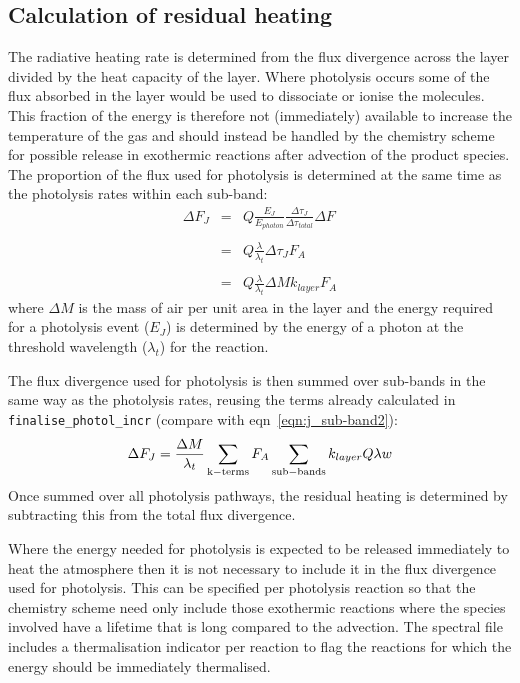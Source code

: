 \subsection{Calculation of residual heating}
The radiative heating rate is determined from the flux divergence across the layer divided by the heat capacity of the layer. Where photolysis occurs some of the flux absorbed in the layer would be used to dissociate or ionise the molecules. This fraction of the energy is therefore not (immediately) available to increase the temperature of the gas and should instead be handled by the chemistry scheme for possible release in exothermic reactions after advection of the product species.
The proportion of the flux used for photolysis is determined at the same time as the photolysis rates within each sub-band:
\begin{eqnarray}
\Delta F_{J} & = & Q \frac{E_J}{E_{photon}} \frac{\Delta \tau_J}{\Delta \tau_{total}} \Delta F \\
  && \nonumber \\
  & = & Q \frac{\lambda}{\lambda_t} \Delta \tau_J F_A \\
  && \nonumber \\
  & = & Q \frac{\lambda}{\lambda_t} \Delta M k_{layer} F_A
\end{eqnarray}
where $\Delta M$ is the mass of air per unit area in the layer and the energy required for a photolysis event ($E_J$) is determined by the energy of a photon at the threshold wavelength ($\lambda_t$) for the reaction.

The flux divergence used for photolysis is then summed over sub-bands in the same way as the photolysis rates, reusing the terms already calculated in {\tt finalise\_photol\_incr} (compare with eqn~\ref{eqn:j_sub-band2}):
\begin{equation}
\Delta F_{J} = \frac{\Delta M}{\lambda_t} \sum_{\rm k-terms} F_A \sum_{\rm sub-bands} k_{layer} Q \lambda w
\end{equation}
Once summed over all photolysis pathways, the residual heating is determined by subtracting this from the total flux divergence.

Where the energy needed for photolysis is expected to be released immediately to heat the atmosphere then it is not necessary to include it in the flux divergence used for photolysis. This can be specified per photolysis reaction so that the chemistry scheme need only include those exothermic reactions where the species involved have a lifetime that is long compared to the advection. The spectral file includes a thermalisation indicator per reaction to flag the reactions for which the energy should be immediately thermalised. 

